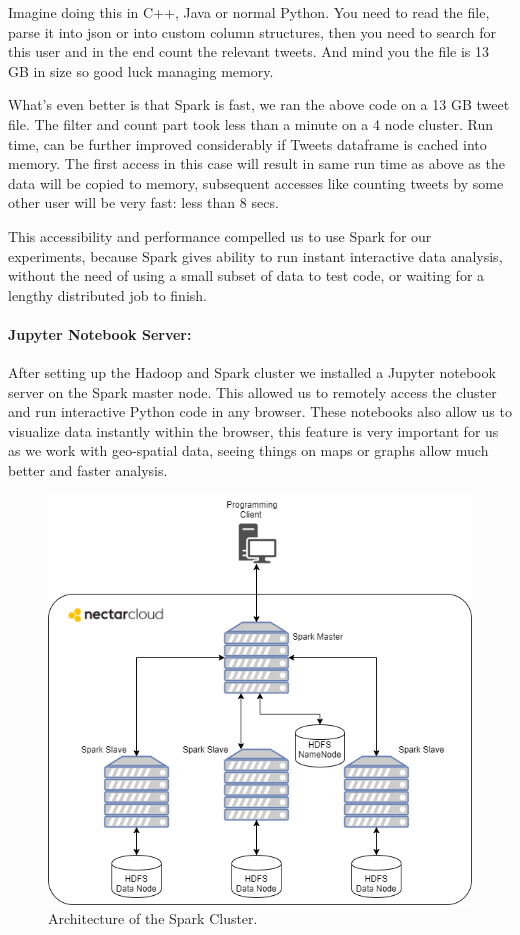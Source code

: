 \documentclass[12pt]{report}
\theoremstyle{named}
\begin{document}
\inputminted{python}{sparkCount.py}

Imagine doing this in C++, Java or normal Python. You need to read the file, parse it into json or into custom column structures, then you need to search for this user and in the end count the relevant tweets. And mind you the file is 13 GB in size so good luck managing memory.

What's even better is that Spark is fast, we ran the above code on a 13 GB tweet file. The filter and count part took less than a minute on a 4 node cluster. Run time, can be further improved considerably if Tweets dataframe is cached into memory. The first access in this case will result in same run time as above as the data will be copied to memory, subsequent accesses like counting tweets by some other user will be very fast: less than 8 secs.

This accessibility and performance compelled us to use Spark for our experiments, because Spark gives ability to run instant interactive data analysis, without the need of using a small subset of data to test code, or waiting for a lengthy distributed job to finish.


\paragraph{Jupyter Notebook Server:\\}
After setting up the Hadoop and Spark cluster we installed a Jupyter notebook server on the Spark master node. This allowed us to remotely access the cluster and run interactive Python code in any browser. These notebooks also allow us to visualize data instantly within the browser, this feature is very important for us as we work with geo-spatial data, seeing things on maps or graphs allow much better and faster analysis.
\begin{figure}[ht]
\centering
        \includegraphics[width=120mm,scale=1]{Images/Spark.png}
    \caption{Architecture of the Spark Cluster.}
    \label{fig:sparkCluster}
\end{figure}
\end{document}
